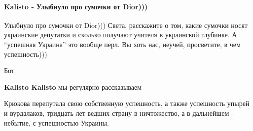  
 
 
 
 
\paragraph{Kalisto - Улыбнуло про сумочки от Dior)))}
\label{sec:14_07_2021.fb.krjukova_svetlana.1.statja_putina_mnenie.cmt.kalisto_uspeshnost}

\begin{itemize}
 
Улыбнуло про сумочки от Dior))) Света, расскажите о том, какие сумочки носят украинские депутатки и сколько получают учителя в украинской глубинке. А \enquote{успешная Украина} это вообще перл. Вы хоть нас, неучей, просветите, в чем успешность)))

\begin{itemize}
 
Бот

 
\textbf{Kalisto Kalisto} мы регулярно рассказываем

 

Крюкова перепутала свою собственную успешность, а также успешность упырей и
вурдалаков, тридцать лет ведших страну в ничтожество, а в дальнейшем - небытие,
с успешностью Украины.


\end{itemize}
\end{itemize}
